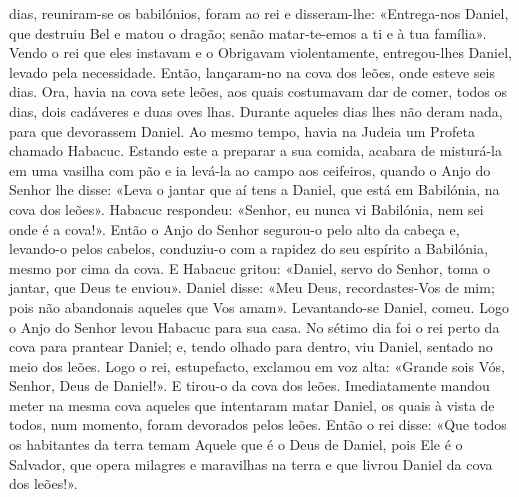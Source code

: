 \begin{paracol}{2}
{ dias, reuniram-se os babilónios, foram ao rei e disseram-lhe: «Entrega-nos Daniel, que destruiu Bel e matou o dragão; senão matar-te-emos a ti e à tua família». Vendo o rei que eles instavam e o Obrigavam violentamente, entregou-lhes Daniel, levado pela necessidade. Então, lançaram-no na cova dos leões, onde esteve seis dias. Ora, havia na cova sete leões, aos quais costumavam dar de comer, todos os dias, dois cadáveres e duas oves lhas. Durante aqueles dias lhes não deram nada, para que devorassem Daniel. Ao mesmo tempo, havia na Judeia um Profeta chamado Habacuc. Estando este a preparar a sua comida, acabara de misturá-la em uma vasilha com pão e ia levá-la ao campo aos ceifeiros, quando o Anjo do Senhor lhe disse: «Leva o jantar que aí tens a Daniel, que está em Babilónia, na cova dos leões». Habacuc respondeu: «Senhor, eu nunca vi Babilónia, nem sei onde é a cova!». Então o Anjo do Senhor segurou-o pelo alto da cabeça e, levando-o pelos cabelos, conduziu-o com a rapidez do seu espírito a Babilónia, mesmo por cima da cova. E Habacuc gritou: «Daniel, servo do Senhor, toma o jantar, que Deus te enviou». Daniel disse: «Meu Deus, recordastes-Vos de mim; pois não abandonais aqueles que Vos amam». Levantando-se Daniel, comeu. Logo o Anjo do Senhor levou Habacuc para sua casa. No sétimo dia foi o rei perto da cova para prantear Daniel; e, tendo olhado para dentro, viu Daniel, sentado no meio dos leões. Logo o rei, estupefacto, exclamou em voz alta: «Grande sois Vós, Senhor, Deus de Daniel!». E tirou-o da cova dos leões. Imediatamente mandou meter na mesma cova aqueles que intentaram matar Daniel, os quais à vista de todos, num momento, foram devorados pelos leões. Então o rei disse: «Que todos os habitantes da terra temam Aquele que é o Deus de Daniel, pois Ele é o Salvador, que opera milagres e maravilhas na terra e que livrou Daniel da cova dos leões!».
}\end{paracol}

\begin{paracol}{2}\switchcolumn{}\end{paracol}

